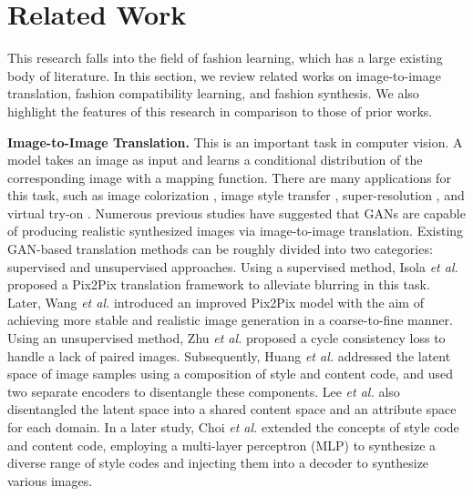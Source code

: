 \section{Related Work}
\label{related_work}
This research falls into the field of fashion learning, which has a large existing body of literature. In this section, we review related works on image-to-image translation, fashion compatibility learning, and fashion synthesis. We also highlight the features of this research in comparison to those of prior works.

\textbf{Image-to-Image Translation.} This is an important task in computer vision. A model takes an image as input and learns a conditional distribution of the corresponding image with a mapping function. There are many applications for this task, such as image colorization \cite{pix2pix2017}, image style transfer \cite{Gatys_2016_CVPR}, super-resolution \cite{ledig2017photo}, and virtual try-on \cite{Han_2018_viton,tileimage}. Numerous previous studies have suggested that GANs \cite{NIPS2014_gan} are capable of producing realistic synthesized images via image-to-image translation. Existing GAN-based translation methods can be roughly divided into two categories: supervised and unsupervised approaches. Using a supervised method, Isola \textit{et al.} \cite{pix2pix2017} proposed a Pix2Pix translation framework to alleviate blurring in this task. Later, Wang \textit{et al.} \cite{wang2018pix2pixHD} introduced an improved Pix2Pix model with the aim of achieving more stable and realistic image generation in a coarse-to-fine manner. Using an unsupervised method, Zhu \textit{et al.} \cite{CycleGAN2017} proposed a cycle consistency loss to handle a lack of paired images. Subsequently, Huang \textit{et al.} \cite{huang2018munit} addressed the latent space of image samples using a composition of style and content code, and used two separate encoders to disentangle these components. Lee \textit{et al.} \cite{DRIT_plus} also disentangled the latent space into a shared content space and an attribute space for each domain. In a later study, Choi \textit{et al.} \cite{choi2020starganv2} extended the concepts of style code and content code, employing a multi-layer perceptron (MLP) to synthesize a diverse range of style codes and injecting them into a decoder to synthesize various images.

